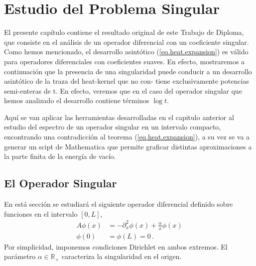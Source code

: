 \chapter{Estudio del Problema Singular}

El presente capítulo contiene el resultado original de este Trabajo de Diploma, que consiste en el análisis de un operador diferencial con un coeficiente singular. Como hemos mencionado, el desarrollo asintótico (\ref{eq.heat.expansion})
es válido para operadores diferenciales con coeficientes suaves. En efecto,
mostraremos a continuación que la presencia de una singularidad puede
conducir a un desarrollo asintótico de la traza del heat-kernel que no con-
tiene exclusivamente potencias semi-enteras de t. En efecto, veremos que
en el caso del operador singular que hemos analizado el desarrollo contiene
términos $\log t$.

Aquí se van aplicar las herramientas desarrolladas en el capitulo anterior
al estudio del espectro de un operador singular en un intervalo compacto,
encontrando una contradicción al teorema (\ref{eq.heat.expansion}), a su vez se va a generar un scipt de Mathematica que permite graficar distintas aproximaciones a
la parte finita de la energía de vacío.


\section{El Operador Singular}


En está sección se estudiará el siguiente operador diferencial definido sobre funciones en el intervalo $[0,L]$,
\begin{equation}
\begin{aligned}
    A \phi (x) &= - \partial ^2 _x  \phi(x) + \frac{\alpha}{x} \phi(x) \\[5pt]
    \phi(0) &= \phi(L) = 0 \, .
\end{aligned}
\label{operador}
\end{equation}
Por simplicidad, imponemos condiciones Dirichlet en ambos extremos. El parámetro $\alpha \in \mathbb{R _{+}}$ caracteriza la singularidad en el origen.

